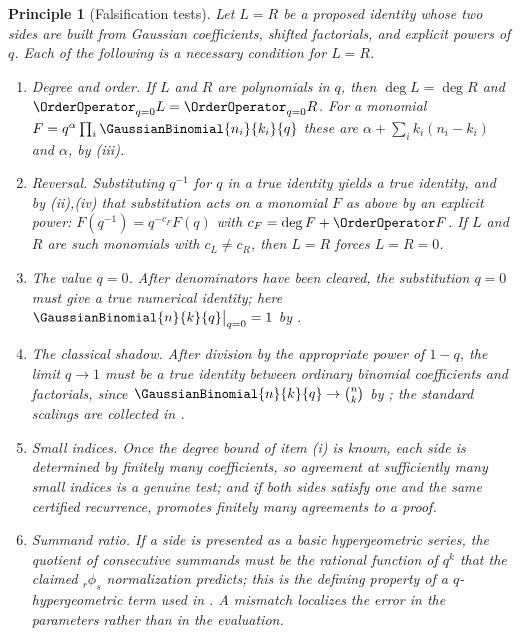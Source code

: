 \documentclass[11pt,a4paper,oneside,openany]{book}
\newtheorem{principle}[principle]{Principle}
\theoremstyle{definition}
\theoremstyle{remark}
\begin{document}
\begin{principle}[Falsification tests]\label{prin:identity-tests}
Let $L=R$ be a proposed identity whose two sides are built from Gaussian
coefficients, shifted factorials, and explicit powers of $q$.  Each of the
following is a necessary condition for $L=R$.
\begin{enumerate}
\item \emph{Degree and order.}  If $L$ and $R$ are polynomials in $q$, then
 $\deg L=\deg R$ and $\OrderOperator_{q=0}L=\OrderOperator_{q=0}R$.  For a monomial
 $F=q^{\alpha}\prod_i\GaussianBinomial{n_i}{k_i}{q}$ these are
 $\alpha+\sum_ik_i(n_i-k_i)$ and $\alpha$, by
 (iii).
\item \emph{Reversal.}  Substituting $q^{-1}$ for $q$ in a true identity
 yields a true identity, and by (ii),(iv) that
 substitution acts on a monomial $F$ as above by an explicit power:
 $F(q^{-1})=q^{-c_F}F(q)$ with $c_F=\deg F+\OrderOperator F$.  If $L$ and $R$ are such
 monomials with $c_L\ne c_R$, then $L=R$ forces $L=R=0$.
\item \emph{The value $q=0$.}  After denominators have been cleared, the
 substitution $q=0$ must give a true numerical identity; here
 $\GaussianBinomial{n}{k}{q}\big|_{q=0}=1$ by .
\item \emph{The classical shadow.}  After division by the appropriate power
 of $1-q$, the limit $q\to1$ must be a true identity between ordinary
 binomial coefficients and factorials, since $\GaussianBinomial{n}{k}{q}\to\binom nk$ by
 ; the standard scalings are collected in
 .
\item \emph{Small indices.}  Once the degree bound of item (i) is known, each
 side is determined by finitely many coefficients, so agreement at
 sufficiently many small indices is a genuine test; and if both sides satisfy
 one and the same certified recurrence, 
 promotes finitely many agreements to a proof.
\item \emph{Summand ratio.}  If a side is presented as a basic hypergeometric
 series, the quotient of consecutive summands must be the rational function
 of $q^k$ that the claimed ${}_r\phi_s$ normalization predicts; this is the
 defining property of a $q$-hypergeometric term used in
 .  A mismatch localizes the error in the
 parameters rather than in the evaluation.
\end{enumerate}
\end{principle}
\end{document}
